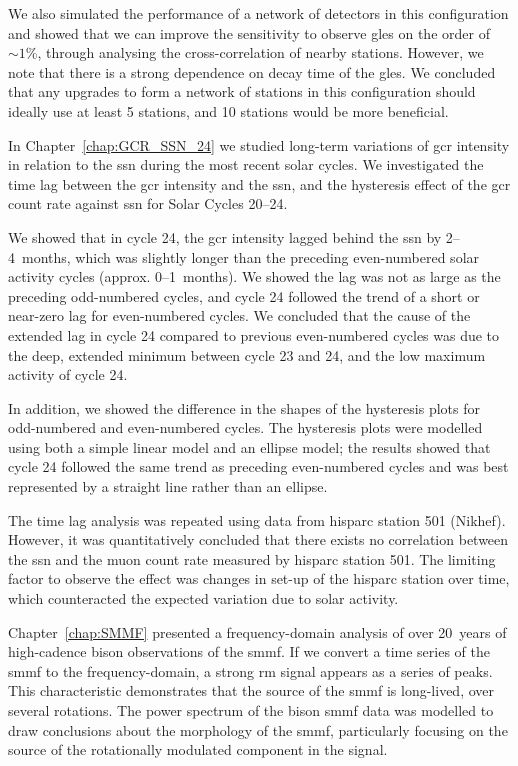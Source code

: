 We also simulated the performance of a network of detectors in this configuration and showed that we can improve the sensitivity to observe \glspl{gle} on the order of $\sim 1 \%$, through analysing the cross-correlation of nearby stations. However, we note that there is a strong dependence on decay time of the \glspl{gle}. We concluded that any upgrades to form a network of stations in this configuration should ideally use at least 5 stations, and 10 stations would be more beneficial.


\vspace{2em}


In Chapter~\ref{chap:GCR_SSN_24} we studied long-term variations of \gls{gcr} intensity in relation to the \gls{ssn} during the most recent solar cycles. We investigated the time lag between the \gls{gcr} intensity and the \gls{ssn}, and the hysteresis effect of the \gls{gcr} count rate against \gls{ssn} for Solar Cycles 20--24.

We showed that in cycle 24, the \gls{gcr} intensity lagged behind the \gls{ssn} by 2--4~months, which was slightly longer than the preceding even-numbered solar activity cycles (approx. 0--1~months). We showed the lag was not as large as the preceding odd-numbered cycles, and cycle 24 followed the trend of a short or near-zero lag for even-numbered cycles. We concluded that the cause of the extended lag in cycle 24 compared to previous even-numbered cycles was due to the deep, extended minimum between cycle 23 and 24, and the low maximum activity of cycle 24.

In addition, we showed the difference in the shapes of the hysteresis plots for odd-numbered and even-numbered cycles. The hysteresis plots were modelled using both a simple linear model and an ellipse model; the results showed that cycle 24 followed the same trend as preceding even-numbered cycles and was best represented by a straight line rather than an ellipse.

The time lag analysis was repeated using data from \gls{hisparc} station 501 (Nikhef). However, it was quantitatively concluded that there exists no correlation between the \gls{ssn} and the muon count rate measured by \gls{hisparc} station 501. The limiting factor to observe the effect was changes in set-up of the \gls{hisparc} station over time, which counteracted the expected variation due to solar activity.


\vspace{2em}


Chapter~\ref{chap:SMMF} presented a frequency-domain analysis of over 20~years of high-cadence \gls{bison} observations of the \gls{smmf}. If we convert a time series of the \gls{smmf} to the frequency-domain, a strong \gls{rm} signal appears as a series of peaks. This characteristic demonstrates that the source of the \gls{smmf} is long-lived, over several rotations. The power spectrum of the \gls{bison} \gls{smmf} data was modelled to draw conclusions about the morphology of the \gls{smmf}, particularly focusing on the source of the rotationally modulated component in the signal.

